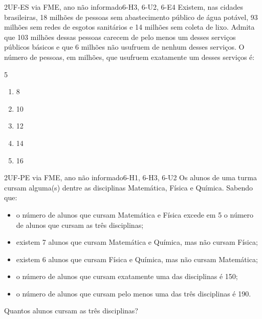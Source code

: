 \begin{questao}{2}{UF-ES via FME, ano não informado}{6-H3, 6-U2, 6-E4}\label{u6:ufes28}
Existem, nas cidades brasileiras, 18 milhões de pessoas sem abastecimento público de água potável, 93 milhões sem redes de esgotos sanitários e 14 milhões sem coleta de lixo. Admita que 103 milhões dessas pessoas carecem de pelo menos um desses serviços públicos básicos e que 6 milhões não usufruem de nenhum desses serviços. O número de pessoas, em milhões, que usufruem exatamente um desses serviços é:
\begin{multicols}{5}
\begin{enumerate}[label=\alph*)]
  \item 8
  \item 10
  \item 12
  \item 14
  \item 16
\end{enumerate}
\end{multicols}
\end{questao}

\begin{questao}{2}{UF-PE via FME, ano não informado}{6-H1, 6-H3, 6-U2}\label{u6:ufpe34}
Os alunos de uma turma cursam alguma(s) dentre as disciplinas Matemática, Física e Química. Sabendo que:
\begin{itemize}[leftmargin=1.4em,itemsep=0pt]
  \item o número de alunos que cursam Matemática e Física excede em 5 o número de alunos que cursam as três disciplinas;
  \item existem 7 alunos que cursam Matemática e Química, mas não cursam Física;
  \item existem 6 alunos que cursam Física e Química, mas não cursam Matemática;
  \item o número de alunos que cursam exatamente uma das disciplinas é 150;
  \item o número de alunos que cursam pelo menos uma das três disciplinas é 190.
\end{itemize}
Quantos alunos cursam as três disciplinas?
\end{questao}

